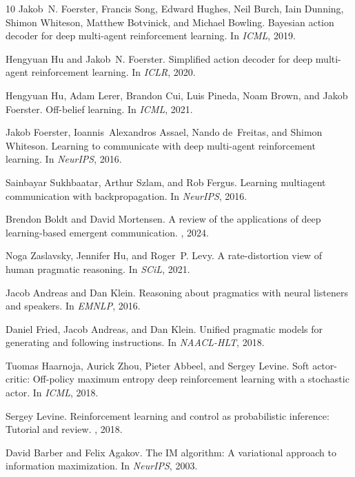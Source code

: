 \documentclass[sigconf,review,anonymous]{acmart}
\begin{document}
\begin{thebibliography}{10}
Jakob~N. Foerster, Francis Song, Edward Hughes, Neil Burch, Iain Dunning, Shimon Whiteson, Matthew Botvinick, and Michael Bowling.
\newblock Bayesian action decoder for deep multi-agent reinforcement learning.
\newblock In {\em ICML}, 2019.

Hengyuan Hu and Jakob~N. Foerster.
\newblock Simplified action decoder for deep multi-agent reinforcement learning.
\newblock In {\em ICLR}, 2020.

Hengyuan Hu, Adam Lerer, Brandon Cui, Luis Pineda, Noam Brown, and Jakob Foerster.
\newblock Off-belief learning.
\newblock In {\em ICML}, 2021.

Jakob Foerster, Ioannis~Alexandros Assael, Nando de~Freitas, and Shimon Whiteson.
\newblock Learning to communicate with deep multi-agent reinforcement learning.
\newblock In {\em NeurIPS}, 2016.

Sainbayar Sukhbaatar, Arthur Szlam, and Rob Fergus.
\newblock Learning multiagent communication with backpropagation.
\newblock In {\em NeurIPS}, 2016.

Brendon Boldt and David Mortensen.
\newblock A review of the applications of deep learning-based emergent communication.
, 2024.

Noga Zaslavsky, Jennifer Hu, and Roger~P. Levy.
\newblock A rate-distortion view of human pragmatic reasoning.
\newblock In {\em SCiL}, 2021.

Jacob Andreas and Dan Klein.
\newblock Reasoning about pragmatics with neural listeners and speakers.
\newblock In {\em EMNLP}, 2016.

Daniel Fried, Jacob Andreas, and Dan Klein.
\newblock Unified pragmatic models for generating and following instructions.
\newblock In {\em NAACL-HLT}, 2018.

Tuomas Haarnoja, Aurick Zhou, Pieter Abbeel, and Sergey Levine.
\newblock Soft actor-critic: Off-policy maximum entropy deep reinforcement learning with a stochastic actor.
\newblock In {\em ICML}, 2018.

Sergey Levine.
\newblock Reinforcement learning and control as probabilistic inference: Tutorial and review.
, 2018.

David Barber and Felix Agakov.
\newblock The IM algorithm: A variational approach to information maximization.
\newblock In {\em NeurIPS}, 2003.


\end{thebibliography}
\end{document}
